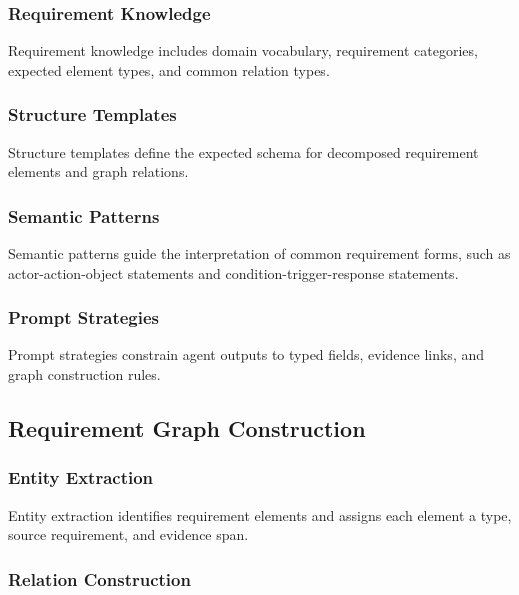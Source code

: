 \subsubsection{Requirement Knowledge}
\label{sec:method-req-knowledge}

Requirement knowledge includes domain vocabulary, requirement categories, expected element types, and common relation types.

\subsubsection{Structure Templates}
\label{sec:method-templates}

Structure templates define the expected schema for decomposed requirement elements and graph relations.

\subsubsection{Semantic Patterns}
\label{sec:method-patterns}

Semantic patterns guide the interpretation of common requirement forms, such as actor-action-object statements and condition-trigger-response statements.

\subsubsection{Prompt Strategies}
\label{sec:method-prompts}

Prompt strategies constrain agent outputs to typed fields, evidence links, and graph construction rules.

\subsection{Requirement Graph Construction}
\label{sec:method-graph}

\subsubsection{Entity Extraction}
\label{sec:method-entity}

Entity extraction identifies requirement elements and assigns each element a type, source requirement, and evidence span.

\subsubsection{Relation Construction}
\label{sec:method-relation}

